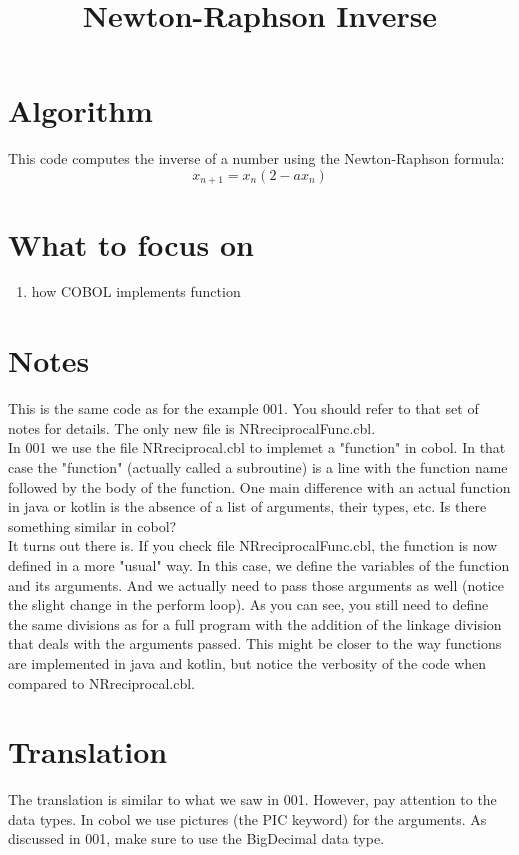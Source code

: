 \documentclass[letter,12pt]{article}
\begin{document}
\title{Newton-Raphson Inverse} 
\maketitle

\section{Algorithm}
This code computes the inverse of a number using the Newton-Raphson formula:
\begin{equation}
    x_{n+1}=x_n(2-ax_n)
\end{equation}

\section{What to focus on}
\begin{enumerate}
    \item how COBOL implements function
\end{enumerate}


\section{Notes}
This is the same code as for the example 001. You should refer to that set of notes for details.
The only new file is NRreciprocalFunc.cbl.\\
 In 001 we use the file NRreciprocal.cbl to implemet a "function" in cobol. 
In that case the "function" (actually called a subroutine) is a line with the function name followed by the body of the function. 
One main difference with an actual function in java or kotlin is the absence of a list of arguments, their types, etc. Is there something similar in cobol?\\
It turns out there is. If you check file NRreciprocalFunc.cbl, the function is now defined in a more "usual" way. 
In this case, we define the variables of the function and its arguments. And we actually need to pass those arguments as well (notice the slight change in the perform loop). 
As you can see, you still need to define the same divisions as for a full program with the addition of the linkage division that deals with the arguments passed.
This might be closer to the way functions are implemented in java and kotlin, but notice the verbosity of the code when compared to NRreciprocal.cbl.


\section{Translation}
The translation is similar to what we saw in 001. However, pay attention to the data types. In cobol we use pictures (the PIC keyword) for the arguments. 
As discussed in 001, make sure to use the BigDecimal data type.
\end{document}
